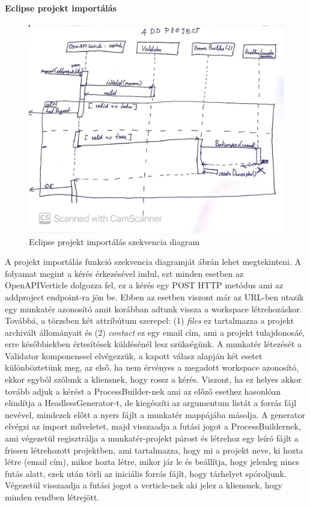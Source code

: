 \paragraph{Eclipse projekt importálás}
\begin{figure}[!ht]
	\includegraphics[width=150mm, keepaspectratio]{figures/add_eclipseproject_seq.jpg}
	\caption{Eclipse projekt importálás szekvencia diagram}
	\label{fig:addproject}
\end{figure}

A projekt importálás funkció szekvencia diagramját  ábrán lehet megtekinteni. A folyamat megint a kérés érkezésével indul, ezt minden esetben az OpenAPIVerticle dolgozza fel, ez a kérés egy POST HTTP metódus ami az addproject endpoint-ra jön be. Ebben az esetben viszont már az URL-ben utazik egy munkatér azonosító amit korábban adtunk vissza a workspace létrehozáskor. Továbbá, a törzsben két attribútum szerepel: (1) \textit{files} ez tartalmazza a projekt archivált állományait és (2) \textit{contact} ez egy email cím, ami a projekt tulajdonosáé, erre későbbiekben értesítések küldésénél lesz szükségünk. A munkatér létezését a Validator komponenssel elvégezzük, a kapott válasz alapján két esetet különböztetünk meg, az első, ha nem érvényes a megadott workspace azonosító, ekkor egyből szólunk a kliensnek, hogy rossz a kérés. Viszont, ha ez helyes akkor tovább adjuk a kérést a ProcessBuilder-nek ami az előző esethez hasonlóan elindítja a HeadlessGenerator-t, de kiegészíti az argumentum listát a forrás fájl nevével, mindezek előtt a nyers fájlt a munkatér mappájába másolja. A generator elvégzi az import műveletet, majd visszaadja a futási jogot a ProcessBuildernek, ami végezetül regisztrálja a munkatér-projekt párost és létrehoz egy leíró fájlt a frissen létrehozott projektben, ami tartalmazza, hogy mi a projekt neve, ki hozta létre (email cím), mikor hozta létre, mikor jár le és beállítja, hogy jelenleg nincs futás alatt, ezek után törli az iniciális forrás fájlt, hogy tárhelyet spóroljunk. Végezetül visszaadja a futási jogot a verticle-nek aki jelez a kliensnek, hogy minden rendben létrejött.



